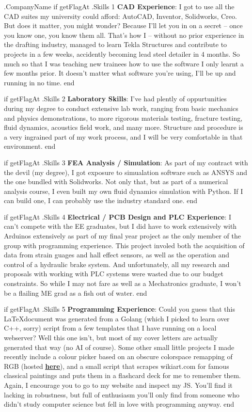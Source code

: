 \documentclass[10pt]{letter}
\begin{document}
\begin{letter}{
    {{ .CompanyName }}
}
{{ if getFlagAt .Skills 1 }}
\textbf{CAD Experience}: I got to use all the CAD suites my university could afford: AutoCAD, Inventor, Solidworks, Creo. But does it matter, you might wonder? Because I'll let you in on a secret -- once you know one, you know them all. That's how I -- without no prior experience in the drafting industry, managed to learn Tekla Structures and contribute to projects in a few weeks, accidently becoming lead steel detailer in 4 months. So much so that I was teaching new trainees how to use the software I only learnt a few months prior. It doesn't matter what software you're using, I'll be up and running in no time. 
{{ end }}

{{ if getFlagAt .Skills 2 }}
\textbf{Laboratory Skills}: I've had plently of oppurtunities during my degree to conduct extensive lab work, ranging from basic mechanics and physics demonstrations, to more rigorous materials testing, fracture testing, fluid dynamics, acoustics field work, and many more. Structure and procedure is a very ingrained part of my work process, and I will be very comfortable in that environment. 
{{ end }}

{{ if getFlagAt .Skills 3 }}
\textbf{FEA Analysis / Simulation}: As part of my contract with the devil (my degree), I got exposure to simualation software such as  ANSYS and the one bundled with Solidworks. Not only that, but as part of a numerical analysis course, I even built my own fluid dynamics simulation with Python. If I can build one, I can probably use the industry standard one. 
{{ end }}

{{ if getFlagAt .Skills 4 }}
\textbf{Electrical / PCB Design and PLC Experience}: I can't compete with the EE graduates, but I did have to work extensively with Arduinos extensively as part of my final year project as the only member of the group with programming experience. This project involed both the acquisition of data from strain guages and hall effect sensors, as well as the operation and control of a hydraulic brake system. And unfortunately, all my research and proposals with working with PLC systems were wasted due to our budget constraints. So while I may not fare as well as a Mechatronics graduate, I won't be a flailing ME grad as a fish out of water. 
{{ end }}

{{ if getFlagAt .Skills 5 }}
\textbf{Programming Experience}: Could you guess that this \LaTeX document was generated from a Golang (which I picked to learn over C++, sorry) script from a few templates that I have running on a local webserver? Well this one isn't, but most of my cover letters are actually generated that way (no AI of course). Some other small little projects I made recently include a colour picker based on an obscure colorspace remapping of RGB (hosted \underline{\textbf{\href{https://zabuzabuzazaa.xyz/home/ok_palette/}{here}}}), and a small script that scrapes wikiart.com for famous classical paintings and puts them in a flashcard deck for me to remember them. Again, I encourage you to go to my website and inspect my JS. You'll find it lacking in robustness, but full of enthusiasm you'll only find from someone who didn't study computer science but fell in love with programming anyway. 
{{ end }}


\end{letter}
\end{document}
